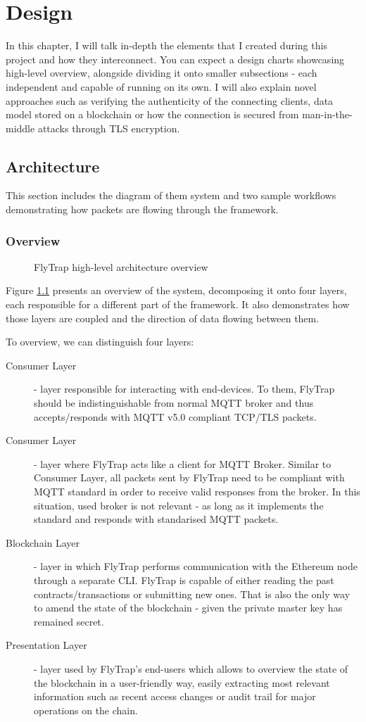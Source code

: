\chapter{Design\label{chap:design}}
In this chapter, I will talk in-depth the elements that I created during this project and how they interconnect. You can expect a design charts showcasing high-level overview, alongside dividing it onto smaller subsections - each independent and capable of running on its own. I will also explain novel approaches such as verifying the authenticity of the connecting clients, data model stored on a blockchain or how the connection is secured from man-in-the-middle attacks through TLS encryption.

\section{Architecture}
This section includes the diagram of them system and two sample workflows demonstrating how packets are flowing through the framework.
\subsection{Overview}
\begin{figure}[h]
    \centering
    \caption{FlyTrap high-level architecture overview}
    \label{fig:flytrap}
\end{figure}
Figure \ref{fig:flytrap} presents an overview of the system, decomposing it onto four layers, each responsible for a different part of the framework. It also demonstrates how those layers are coupled and the direction of data flowing between them.

To overview, we can distinguish four layers:
\begin{description}
    \item[Consumer Layer] - layer responsible for interacting with end-devices. To them, FlyTrap should be indistinguishable from normal MQTT broker and thus accepts/responds with MQTT v5.0 compliant TCP/TLS packets. 
    \item[Consumer Layer] - layer where FlyTrap acts like a client for MQTT Broker. Similar to Consumer Layer, all packets sent by FlyTrap need to be compliant with MQTT standard in order to receive valid responses from the broker. In this situation, used broker is not relevant - as long as it implements the standard and responds with standarised MQTT packets.
    \item[Blockchain Layer] - layer in which FlyTrap performs communication with the Ethereum node through a separate CLI. FlyTrap is capable of either reading the past contracts/transactions or submitting new ones. That is also the only way to amend the state of the blockchain - given the private master key has remained secret.
    \item[Presentation Layer] - layer used by FlyTrap's end-users which allows to overview the state of the blockchain in a user-friendly way, easily extracting most relevant information such as recent access changes or audit trail for major operations on the chain.
\end{description}


